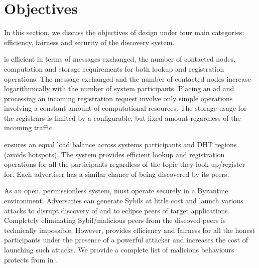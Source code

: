 \section{Objectives}
\label{sec:objectives}

In this section, we discuss the objectives of \sysname design under four main categories: efficiency, fairness and security of the discovery system.


 \sysname is efficient in terms of messages exchanged, the number of contacted nodes, computation and storage requirements for both lookup and registration operations. The message exchanged and the number of contacted nodes increase logarithmically with the number of system participants. Placing an ad and processing an incoming registration request involve only simple operations involving a constant amount of computational resources. The storage usage for the registrars is limited by a configurable, but fixed amount regardless of the incoming traffic. 


 \sysname ensures an equal load balance across systems participants and DHT regions (\ie avoids hotspots). The system provides efficient lookup and registration operations for all the participants regardless of the topic they look up/register for. Each advertiser has a similar chance of being discovered by its peers. 

 As an open, permissionless system, \sysname must operate securely in a Byzantine environment. Adversaries can generate Sybils at little cost and launch various attacks to disrupt discovery of and to eclipse peers of target applications. Completely eliminating Sybil/malicious peers from the discoved peers is technically impossible. However, \sysname provides efficiency and fairness for all the honest participants under the presence of a powerful attacker and increases the cost of launching such attacks. We provide a complete list of malicious behaviours \sysname protects from in .


